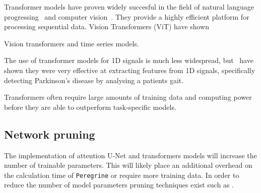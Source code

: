 Transformer models have proven widely succesful in the field of natural language progressing~\cite{Vaswani_2017_transformer} and computer vision~\cite{Dosovitskiy_2021_vit}. They provide a highly efficient platform for processing sequential data. Vision Transformers (ViT) have shown 

Vision transformers and time series models.

The use of transformer models for 1D signals is much less widespread, but~\cite{Nguyen_Miah_Bilodeau_Bouachir_2022} have shown they were very effective at extracting features from 1D signals, specifically detecting Parkinson's disease by analysing a patients gait. 

Transformers often require large amounts of training data and computing power before they are able to outperform task-specific models.

\subsection{Network pruning}

The implementation of attention U-Net and transformers models will increase the number of trainable parameters. This will likely place an additional overhead on the calculation time of \texttt{Peregrine} or require more training data. In order to reduce the number of model parameters pruning techniques exist such as \cite{Fang_Ma_Song_Mi_Wang_2023}.

